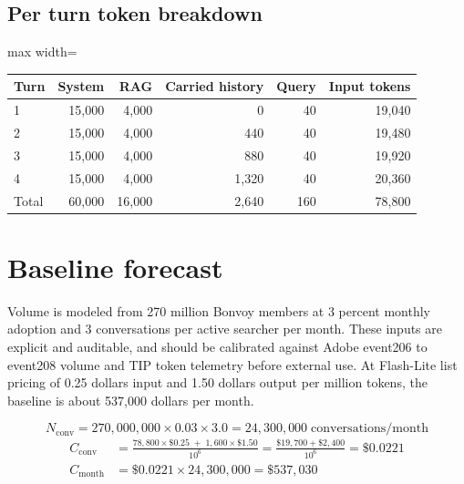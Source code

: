 \documentclass[11pt]{uce-report}
\begin{document}
\subsection{Per turn token breakdown}
\vspace{0.4em}
\noindent\begin{adjustbox}{max width=\linewidth}\begin{tabular}{lrrrrr}
\toprule
\textbf{Turn} & \textbf{System} & \textbf{RAG} & \textbf{Carried history} & \textbf{Query} & \textbf{Input tokens} \\
\midrule
1 & 15,000 & 4,000 & 0 & 40 & 19,040 \\
2 & 15,000 & 4,000 & 440 & 40 & 19,480 \\
3 & 15,000 & 4,000 & 880 & 40 & 19,920 \\
4 & 15,000 & 4,000 & 1,320 & 40 & 20,360 \\
Total & 60,000 & 16,000 & 2,640 & 160 & 78,800 \\
\bottomrule
\end{tabular}\end{adjustbox}

\section{Baseline forecast}
Volume is modeled from 270 million Bonvoy members at 3 percent monthly adoption and 3 conversations per active searcher per month. These inputs are explicit and auditable, and should be calibrated against Adobe event206 to event208 volume and TIP token telemetry before external use. At Flash-Lite list pricing of 0.25 dollars input and 1.50 dollars output per million tokens, the baseline is about 537,000 dollars per month.


\[N_{\text{conv}} = 270{,}000{,}000 \times 0.03 \times 3.0 = 24{,}300{,}000 \;\text{conversations/month}\]
\[
\begin{aligned}
C_{\text{conv}} &= \frac{78{,}800 \times \$0.25 \;+\; 1{,}600 \times \$1.50}{10^{6}}
  = \frac{\$19{,}700 + \$2{,}400}{10^{6}} = \$0.0221 \\[2pt]
C_{\text{month}} &= \$0.0221 \times 24{,}300{,}000 = \$537{,}030
\end{aligned}
\]
\end{document}
